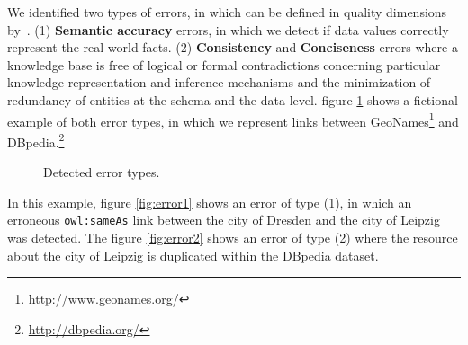 We identified two types of errors, in which can be defined in quality dimensions by~\cite{zaveri2015quality}. (1) \textbf{Semantic accuracy} errors, in which we detect if data values correctly represent the real world facts. (2) \textbf{Consistency} and \textbf{Conciseness} errors where a knowledge base is free of logical or formal contradictions concerning particular knowledge representation and inference mechanisms and the minimization of redundancy of entities at the schema and the data level. 
figure \ref{fig:errorType} shows a fictional example of both error types, in which we represent links between  GeoNames\footnote{\url{http://www.geonames.org/}} and DBpedia.\footnote{\url{http://dbpedia.org/}}
\begin{figure}[H]
	\centering
	\caption{Detected error types.}
	\label{fig:errorType}
\end{figure}
%
In this example, figure \ref{fig:error1} shows an error of type (1), in which an erroneous \texttt{owl:sameAs} link between the city of Dresden and the city of Leipzig was detected. The figure \ref{fig:error2} shows an error of type (2) where the resource about the city of Leipzig is duplicated within the DBpedia dataset. 

